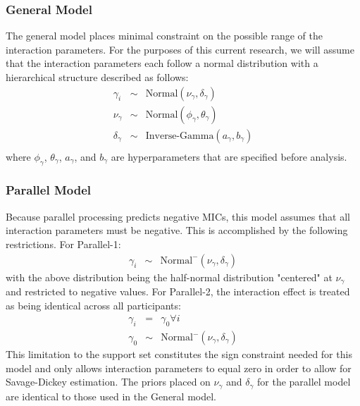 \subsubsection{General Model}
The general model places minimal constraint on the possible range of
the interaction parameters.  For the purposes of this current
research, we will assume that the interaction parameters each follow a
normal distribution with a hierarchical structure described as follows:
\begin{eqnarray*}
\gamma_i &\sim& \mbox{Normal}\left(\nu_{\gamma},\delta_{\gamma}\right)\\
\nu_{\gamma} &\sim& \mbox{Normal}\left(\phi_{\gamma},\theta_{\gamma}\right)\\
\delta_{\gamma} &\sim& \mbox{Inverse-Gamma}\left(a_{\gamma},b_{\gamma}\right)\\
\end{eqnarray*}
where $\phi_{\gamma}$, $\theta_{\gamma}$, $a_{\gamma}$, and
$b_{\gamma}$ are hyperparameters that are specified before analysis.


\subsubsection{Parallel Model}
Because parallel processing predicts negative MICs, this model assumes
that all interaction parameters must be negative.  This is
accomplished by the following restrictions. For Parallel-1:
\begin{eqnarray*}
\gamma_i &\sim& \mbox{Normal}^-(\nu_{\gamma},\delta_{\gamma})
\end{eqnarray*}
with the above distribution being the half-normal distribution "centered" at $\nu_{\gamma}$ and restricted to negative values. 
For Parallel-2, the interaction effect is treated as being identical across all participants:
\begin{eqnarray*}
\gamma_i &=& \gamma_0 \forall i\\
\gamma_0 &\sim& \mbox{Normal}^-(\nu_{\gamma},\delta_{\gamma})
\end{eqnarray*}
This limitation to the support set constitutes the sign constraint needed for this model and only allows interaction parameters to equal zero in order to allow for Savage-Dickey estimation.  The priors placed on $\nu_{\gamma}$ and $\delta_{\gamma}$ for the parallel model are identical to those used in the General model.


